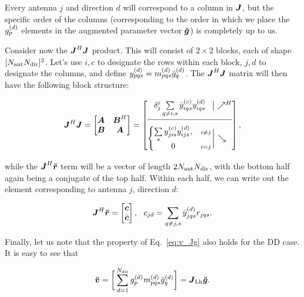 \documentclass[useAMS,usenatbib]{mn2e}
\newcommand{\mat}[1]{{\bmath{#1}}}
\newcommand{\JJ}{\mat{J}} %
\newcommand{\JHJ}{\JJ^H\JJ} %
\begin{document}
Every antenna $j$ and direction $d$ will correspond to a column in $\JJ$, but the specific order of the columns 
(corresponding to the order in which we place the $g^{(d)}_p$ elements in the augmented parameter vector $\Gg$)
is completely up to us. 

Consider now the $\JHJ$ product. This will consist of $2\times2$ blocks, each of shape 
$[N_\mathrm{ant}N_\mathrm{dir}]^2$. Let's use $i,c$ to designate the rows within each block, $j,d$ to designate the columns, 
and define $y^{(d)}_{pqs}=m^{(d)}_{pqs}\bar{g}^{(d)}_q$. The $\JHJ$ matrix will then have the following block 
structure:

\begin{equation}
\JHJ = \Matrix{cc}{\bmath{A}&\bmath{B}^H\\\bmath{B}&\bmath{A}}
= \JHJblocks{
  \delta^i_j \sum\limits_{q\ne i,s} \yycH_{iqs} \yyd_{iqs} 
}{
  \left \{ 
  \begin{array}{@{}cc@{}}
   \sum\limits_{s} \yyc_{jis} \yyd_{ijs},&{\scriptstyle i\ne j} \\
   0 &{\scriptstyle i=j}
  \end{array} \right . 
},
\label{eq:JHJ:DD:unpol}
\end{equation}

while the $\JJ^H\Rr$ term will be a vector of length $2N_\mathrm{ant}N_\mathrm{dir}$, with the bottom half again being
a conjugate of the top half. Within each half, we can write out the element corresponding to 
antenna $j$, direction $d$: 

\begin{equation}
\label{eq:JHR:DD:unpol}
\JJ^H\Rr = \Matrix{c}{\bmath{c}\\\bar{\bmath{c}}},~~c_{jd} = \sum\limits_{q\ne j,s} 
\yydH_{jqs} r_{jqs}.
\end{equation}

Finally, let us note that the property of Eq.~\ref{eq:v_Jg} also holds for the DD case. It is easy to see that

\begin{equation}
\label{eq:v_Jg:dd}
\Vv = \bigg [ \sum_{d=1}^{\Nd} \ggd_p \mmd_{pqs} \ggdH_q \bigg ] = \JJ_\LEFT \Gg.
\end{equation}
\end{document}
